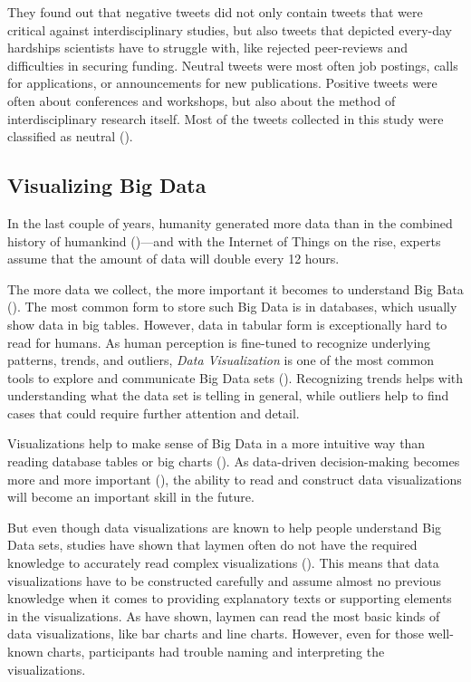 They found out that negative tweets did not only contain tweets that were critical against interdisciplinary studies, but also tweets that depicted every-day hardships scientists have to struggle with, like rejected peer-reviews and difficulties in securing funding. Neutral tweets were most often job postings, calls for applications, or announcements for new publications. Positive tweets were often about conferences and workshops, but also about the method of interdisciplinary research itself. Most of the tweets collected in this study were classified as neutral (\cite[7]{weberInterdisciplinaryOptimismSentiment2019}).


\subsection{Visualizing Big Data}
In the last couple of years, humanity generated more data than in the combined history of humankind (\cite{helbing2019will})---and with the Internet of Things on the rise, experts assume that the amount of data will double every 12 hours.

The more data we collect, the more important it becomes to understand Big Bata (\cite{bornerDataVisualizationLiteracy2019}). The most common form to store such Big Data is in databases, which usually show data in big tables. However, data in tabular form is exceptionally hard to read for humans. As human perception is fine-tuned to recognize underlying patterns, trends, and outliers, \emph{Data Visualization} is one of the most common tools to explore and communicate Big Data sets (\cite{heerTourVisualizationZoo2010}). Recognizing trends helps with understanding what the data set is telling in general, while outliers help to find cases that could require further attention and detail.

Visualizations help to make sense of Big Data in a more intuitive way than reading database tables or big charts (\cite{donalekImmersiveCollaborativeData2014}). As data-driven decision-making becomes more and more important (\cite{brynjolfssonStrengthNumbersHow2011}), the ability to read and construct data visualizations will become an important skill in the future.

But even though data visualizations are known to help people understand Big Data sets, studies have shown that laymen often do not have the required knowledge to accurately read complex visualizations (\cite{bornerInvestigatingAspectsData2016}). This means that data visualizations have to be constructed carefully and assume almost no previous knowledge when it comes to providing explanatory texts or supporting elements in the visualizations. As \citeauthor{bornerInvestigatingAspectsData2016} have shown, laymen can read the most basic kinds of data visualizations, like bar charts and line charts. However, even for those well-known charts, participants had trouble naming and interpreting the visualizations.

